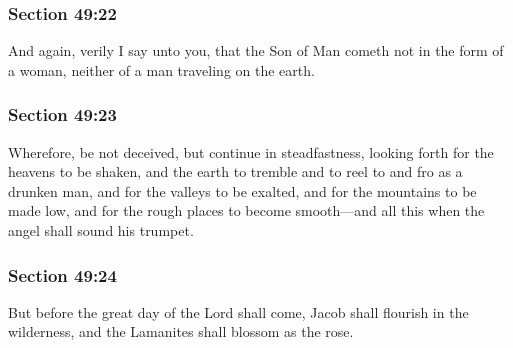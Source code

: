 	\subsubsection{Section 49:22} %
		\label{DC49-22}

		And again, verily I say unto you, that the Son of Man cometh not in the form of a woman, neither of a man traveling on the earth.


	\subsubsection{Section 49:23} %
		\label{DC49-23}

		Wherefore, be not deceived, but continue in steadfastness, looking forth for the heavens to be shaken, and the earth to tremble and to reel to and fro as a drunken man, and for the valleys to be exalted, and for the mountains to be made low, and for the rough places to become smooth---and all this when the angel shall sound his trumpet.


	\subsubsection{Section 49:24} %
		\label{DC49-24}

		But before the great day of the Lord shall come, Jacob shall flourish in the wilderness, and the Lamanites shall blossom as the rose.


